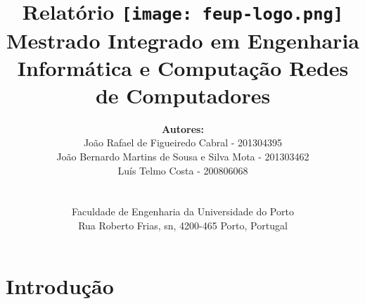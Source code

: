 \documentclass{article}
\begin{document}
\setlength{\textwidth}{16cm}
\setlength{\textheight}{22cm}

\title{
\Large\textbf{Relatório}\linebreak\linebreak
\linebreak\linebreak
\texttt{[image: feup-logo.png]}\linebreak\linebreak
\linebreak\linebreak
\Large{Mestrado Integrado em Engenharia Informática e Computação} \linebreak\linebreak
\Large{Redes de Computadores}\linebreak
}

\author{\textbf{Autores:}\\
João Rafael de Figueiredo Cabral - 201304395 \\
João Bernardo Martins de Sousa e Silva Mota - 201303462 \\
Luís Telmo Costa - 200806068\\
\linebreak\linebreak \\
 \\ Faculdade de Engenharia da Universidade do Porto \\ Rua Roberto Frias, s\/n, 4200-465 Porto, Portugal \linebreak\linebreak\linebreak
\linebreak\linebreak\vspace{1cm}}

\maketitle
\thispagestyle{empty}


\newpage


\section{Introdução}
\end{document}
